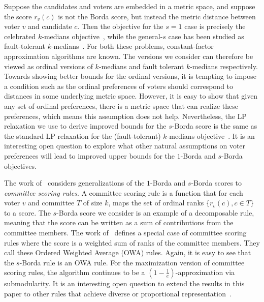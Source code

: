 Suppose the candidates and voters are embedded in a metric space, and suppose  the score $r_v(c)$ is not the Borda score, but instead the metric distance between voter $v$ and candidate $c$. Then the objective for the $s = 1$ case is precisely the celebrated $k$-medians objective~\cite{AryaGKMMP04,JainV,LinV,CharikarGTS}, while the general-$s$ case has been studied as fault-tolerant $k$-medians~\cite{fault}. For both these problems, constant-factor approximation algorithms are known. The versions we consider can therefore be viewed as ordinal versions of $k$-medians and fault tolerant $k$-medians respectively. Towards showing better bounds for the ordinal versions, it is tempting to impose a condition such as the ordinal preferences of voters should correspond to distances in some underlying metric space. However, it is easy to show that given any set of ordinal preferences, there is a metric space that can realize these preferences, which means this assumption does not help. Nevertheless, the LP relaxation we use to derive improved bounds for the $s$-Borda score is the same as the standard LP relaxation for the (fault-tolerant) $k$-medians objective~\cite{fault}. It is an interesting open question to explore what other natural assumptions on voter preferences will lead to improved upper bounds for the $1$-Borda and $s$-Borda objectives.

The work of~\cite{Elkind17} considers generalizations of the $1$-Borda and $s$-Borda scores to \emph{committee scoring rules}. A committee scoring rule is a function that for each voter $v$ and committee $T$ of size $k$, maps the set of ordinal ranks $\{r_v(c), c \in T\}$ to a score. The $s$-Borda score we consider is an example of a decomposable rule, meaning that the score can be written as a sum of contributions from the committee members. The work of~\cite{SkworonFL,SkworonFS15} defines a special case of committee scoring rules where the score is a weighted sum of ranks of the committee members. They call these Ordered Weighted Average (OWA) rules. Again, it is easy to see that the $s$-Borda rule is an OWA rule. For the maximization version of committee scoring rules, the \g{} algorithm continues to be a $\left(1 - \frac{1}{e}\right)$-approximation via submodularity. It is an interesting open question to extend the results in this paper to other rules that achieve diverse or proportional representation~\cite{BrillFST19,AzizB20}.

